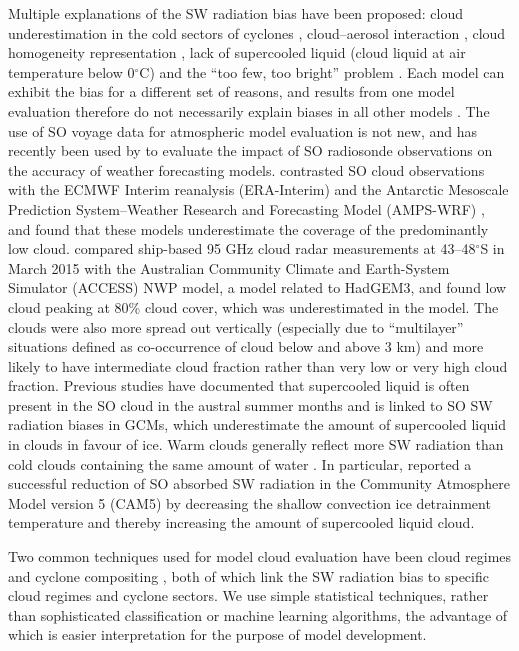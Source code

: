 Multiple explanations of the SW radiation bias have been proposed: cloud
underestimation in the cold sectors of cyclones \citep{bodas-salcedo2014},
cloud--aerosol interaction \citep{vergara-temprado2018}, cloud homogeneity
representation \citep{loveridge2018}, lack of supercooled liquid (cloud liquid
at air temperature below 0$^\circ$C) \citep{kay2016,bodas-salcedo2016} and the
``too few, too bright'' problem \citep{nam2012,klein2013,wall2017}. Each model
can exhibit the bias for a different set of reasons, and results from one model
evaluation therefore do not necessarily explain biases in all other models
\citep{mason2015}. The use of SO voyage data for atmospheric model evaluation
is not new, and has recently been used by \cite{sato2018} to evaluate the
impact of SO radiosonde observations on the accuracy of weather forecasting
models. \cite{klekociuk2018} contrasted SO cloud observations with the ECMWF
Interim reanalysis (ERA-Interim) and the Antarctic Mesoscale Prediction
System--Weather Research and Forecasting Model (AMPS-WRF) \citep{powers2012},
and found that these
models underestimate the coverage of the predominantly low cloud.
\cite{protat2017} compared ship-based 95 GHz cloud radar measurements at
43--48$^\circ$S in March 2015 with the Australian Community Climate and
Earth-System Simulator (ACCESS) NWP model, a model related to HadGEM3, and
found low cloud peaking at 80\% cloud cover, which was underestimated in the
model. The clouds were also more spread out vertically (especially due to
``multilayer'' situations defined as co-occurrence of cloud below and above 3
km) and more likely to have intermediate cloud fraction rather than very low or
very high cloud fraction. Previous studies have documented that supercooled
liquid is often present in the SO cloud in the austral summer months
\citep{morrison2011,huang2012,chubb2013,huang2016,bodas-salcedo2016,jolly2018,listowski2019}
and is linked to SO SW radiation biases in GCMs, which underestimate the amount
of supercooled liquid in clouds in favour of ice. Warm clouds generally reflect
more SW radiation than cold clouds containing the same amount of water
\citep{vergara-temprado2018}. In particular, \cite{kay2016} reported a
successful reduction of SO absorbed SW radiation in the Community Atmosphere
Model version 5 (CAM5) by decreasing the shallow convection ice detrainment
temperature and thereby increasing the amount of supercooled liquid cloud.

Two common techniques used for model cloud evaluation have been cloud regimes
\citep{williams2009a,haynes2011,mason2014,mason2015,mcdonald2016,jin2017,mcdonald2018,schuddeboom2018,schuddeboom2019}
and cyclone compositing
\citep{bodas-salcedo2012,williams2013,bodas-salcedo2014,bodas-salcedo2016,williams2017},
both of which link the SW radiation bias to specific cloud regimes and cyclone
sectors. We use simple statistical techniques, rather than sophisticated
classification or machine learning algorithms, the advantage of which is easier
interpretation for the purpose of model development.

